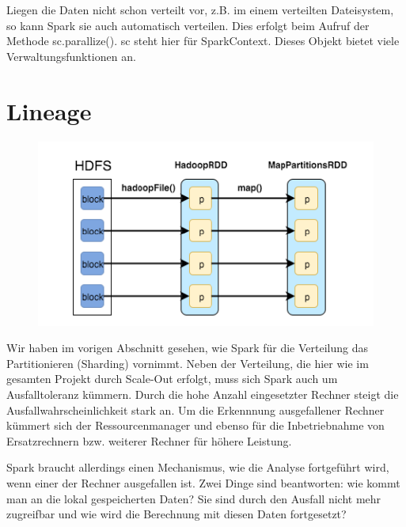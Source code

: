 Liegen die Daten nicht schon verteilt vor, z.B. im einem verteilten
Dateisystem, so kann Spark sie auch automatisch verteilen. Dies erfolgt
beim Aufruf der Methode sc.parallize(). sc steht hier für SparkContext.
Dieses Objekt bietet viele Verwaltungsfunktionen an. 

\section[Lineage]{\rmfamily Lineage}
\begin{figure}
\centering
\includegraphics[width=\textwidth]{bilder/Seminartext-img1.png}
\end{figure}
Wir haben im vorigen Abschnitt gesehen, wie Spark für die Verteilung das
Partitionieren (Sharding) vornimmt. Neben der Verteilung, die hier wie
im gesamten Projekt durch Scale-Out erfolgt, muss sich Spark auch um
Ausfalltoleranz kümmern. Durch die hohe Anzahl eingesetzter Rechner
steigt die Ausfallwahrscheinlichkeit stark an. Um die Erkennnung
ausgefallener Rechner kümmert sich der Ressourcenmanager und ebenso für
die Inbetriebnahme von Ersatzrechnern bzw. weiterer Rechner für höhere
Leistung.

Spark braucht allerdings einen Mechanismus, wie die Analyse fortgeführt
wird, wenn einer der Rechner ausgefallen ist. Zwei Dinge sind
beantworten: wie kommt man an die lokal gespeicherten Daten? Sie sind durch
den Ausfall nicht mehr zugreifbar und wie wird die Berechnung mit
diesen Daten fortgesetzt?

